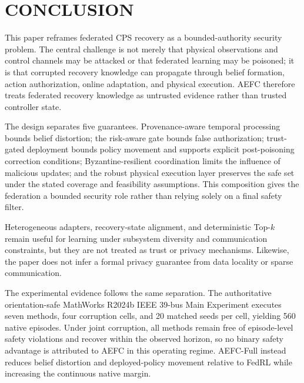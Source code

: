 \section{CONCLUSION}
This paper reframes federated CPS recovery as a bounded-authority security problem. The central challenge is not merely that physical observations and control channels may be attacked or that federated learning may be poisoned; it is that corrupted recovery knowledge can propagate through belief formation, action authorization, online adaptation, and physical execution. AEFC therefore treats federated recovery knowledge as untrusted evidence rather than trusted controller state.

The design separates five guarantees. Provenance-aware temporal processing bounds belief distortion; the risk-aware gate bounds false authorization; trust-gated deployment bounds policy movement and supports explicit post-poisoning correction conditions; Byzantine-resilient coordination limits the influence of malicious updates; and the robust physical execution layer preserves the safe set under the stated coverage and feasibility assumptions. This composition gives the federation a bounded security role rather than relying solely on a final safety filter.

Heterogeneous adapters, recovery-state alignment, and deterministic Top-$k$ remain useful for learning under subsystem diversity and communication constraints, but they are not treated as trust or privacy mechanisms. Likewise, the paper does not infer a formal privacy guarantee from data locality or sparse communication.

The experimental evidence follows the same separation. The authoritative orientation-safe MathWorks R2024b IEEE 39-bus Main Experiment executes seven methods, four corruption cells, and 20 matched seeds per cell, yielding 560 native episodes. Under joint corruption, all methods remain free of episode-level safety violations and recover within the observed horizon, so no binary safety advantage is attributed to AEFC in this operating regime. AEFC-Full instead reduces belief distortion and deployed-policy movement relative to FedRL while increasing the continuous native margin.

